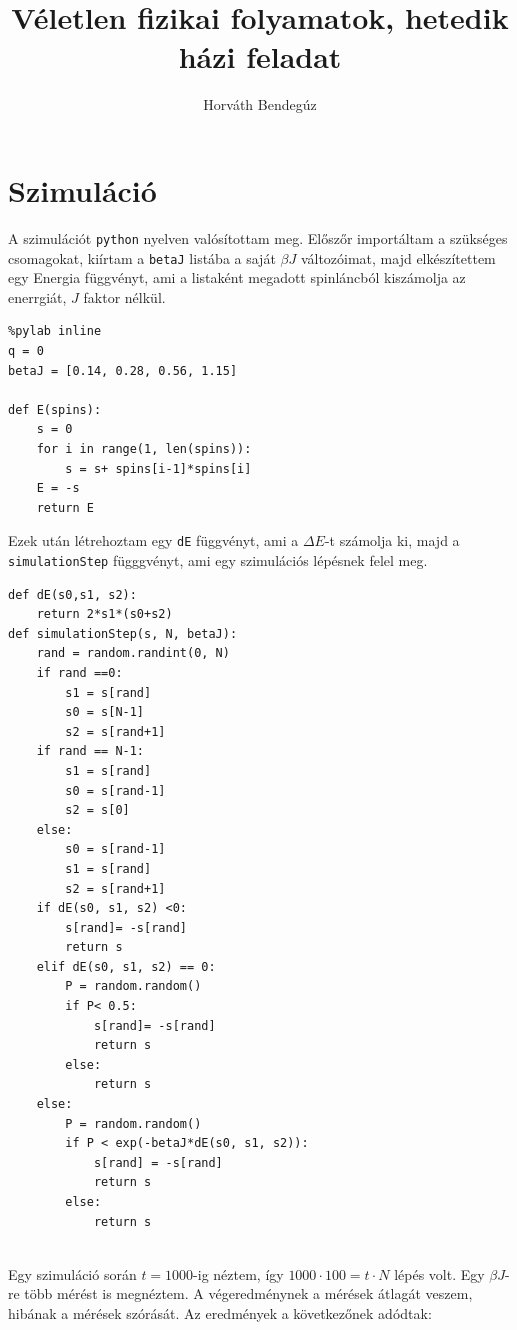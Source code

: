 \documentclass[12pt]{article}
\title{Véletlen fizikai folyamatok, hetedik házi feladat}
\author{Horváth Bendegúz}
\begin{document}

\maketitle
\section*{Szimuláció}

A szimulációt \texttt{python} nyelven valósítottam meg. Előszőr importáltam a szükséges csomagokat, kiírtam a \texttt{betaJ} listába a saját $\beta J$ változóimat, majd elkészítettem egy Energia függvényt, ami a listaként megadott spinláncból kiszámolja az enerrgiát, $J$ faktor nélkül. 
\begin{lstlisting}
%pylab inline
q = 0
betaJ = [0.14, 0.28, 0.56, 1.15]

def E(spins):
    s = 0
    for i in range(1, len(spins)):
        s = s+ spins[i-1]*spins[i]
    E = -s
    return E
\end{lstlisting}
Ezek után létrehoztam egy \texttt{dE} függvényt, ami a $\Delta E$-t számolja ki, majd a \texttt{simulationStep} függgvényt, ami egy szimulációs lépésnek felel meg.
\begin{lstlisting}
def dE(s0,s1, s2):
    return 2*s1*(s0+s2)
def simulationStep(s, N, betaJ):
    rand = random.randint(0, N) 
    if rand ==0:
        s1 = s[rand]
        s0 = s[N-1]
        s2 = s[rand+1]
    if rand == N-1:
        s1 = s[rand]
        s0 = s[rand-1]
        s2 = s[0]
    else:
        s0 = s[rand-1]
        s1 = s[rand]
        s2 = s[rand+1]
    if dE(s0, s1, s2) <0:
        s[rand]= -s[rand]
        return s
    elif dE(s0, s1, s2) == 0:
        P = random.random()
        if P< 0.5:
            s[rand]= -s[rand]
            return s
        else:
            return s
    else: 
        P = random.random()
        if P < exp(-betaJ*dE(s0, s1, s2)):
            s[rand] = -s[rand]
            return s
        else:
            return s
        
\end{lstlisting}
Egy szimuláció során $t =1000$-ig néztem, így $1000\cdot 100 = t\cdot N$ lépés volt. Egy $\beta J$-re több mérést is megnéztem. A végeredménynek a mérések átlagát veszem, hibának a mérések szórását. Az eredmények a következőnek adódtak: 
\end{document}
